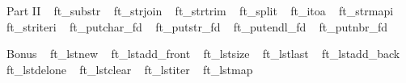 Part II ~\newline
 ft\+\_\+substr ~\newline
 ft\+\_\+strjoin ~\newline
 ft\+\_\+strtrim ~\newline
 ft\+\_\+split ~\newline
 ft\+\_\+itoa ~\newline
 ft\+\_\+strmapi ~\newline
 ft\+\_\+striteri ~\newline
 ft\+\_\+putchar\+\_\+fd ~\newline
 ft\+\_\+putstr\+\_\+fd ~\newline
 ft\+\_\+putendl\+\_\+fd ~\newline
 ft\+\_\+putnbr\+\_\+fd ~\newline


Bonus ~\newline
 ft\+\_\+lstnew ~\newline
 ft\+\_\+lstadd\+\_\+front ~\newline
 ft\+\_\+lstsize ~\newline
 ft\+\_\+lstlast ~\newline
 ft\+\_\+lstadd\+\_\+back ~\newline
 ft\+\_\+lstdelone ~\newline
 ft\+\_\+lstclear ~\newline
 ft\+\_\+lstiter ~\newline
 ft\+\_\+lstmap ~\newline
 
